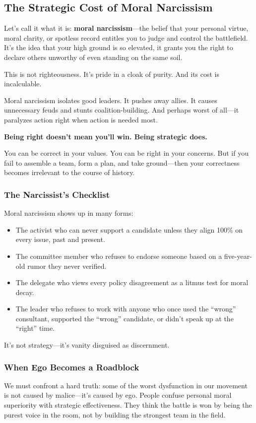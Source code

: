 \subsection*{The Strategic Cost of Moral Narcissism}

Let’s call it what it is: \textbf{moral narcissism}—the belief that your personal virtue, moral clarity, or spotless record entitles you to judge and control the battlefield. It’s the idea that your high ground is so elevated, it grants you the right to declare others unworthy of even standing on the same soil.

This is not righteousness. It’s pride in a cloak of purity. And its cost is incalculable.

Moral narcissism isolates good leaders. It pushes away allies. It causes unnecessary feuds and stunts coalition-building. And perhaps worst of all—it paralyzes action right when action is needed most.

\textbf{Being right doesn’t mean you’ll win. Being strategic does.}

You can be correct in your values. You can be right in your concerns. But if you fail to assemble a team, form a plan, and take ground—then your correctness becomes irrelevant to the course of history.

\subsubsection*{The Narcissist’s Checklist}
Moral narcissism shows up in many forms:
\begin{itemize}
    \item The activist who can never support a candidate unless they align 100\% on every issue, past and present.
    \item The committee member who refuses to endorse someone based on a five-year-old rumor they never verified.
    \item The delegate who views every policy disagreement as a litmus test for moral decay.
    \item The leader who refuses to work with anyone who once used the ``wrong'' consultant, supported the ``wrong'' candidate, or didn’t speak up at the ``right'' time.
\end{itemize}

It’s not strategy—it’s vanity disguised as discernment.

\subsubsection*{When Ego Becomes a Roadblock}
We must confront a hard truth: some of the worst dysfunction in our movement is not caused by malice—it’s caused by ego. People confuse personal moral superiority with strategic effectiveness. They think the battle is won by being the purest voice in the room, not by building the strongest team in the field.

